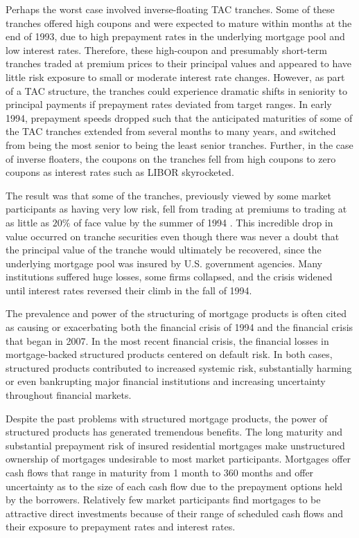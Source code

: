 \documentclass[11pt]{article}
\begin{document}
Perhaps the worst case involved inverse-floating TAC tranches. Some of these tranches offered high coupons and were expected to mature within months at the end of 1993, due to high prepayment rates in the underlying mortgage pool and low interest rates. Therefore, these high-coupon and presumably short-term tranches traded at premium prices to their principal values and appeared to have little risk exposure to small or moderate interest rate changes. However, as part of a TAC structure, the tranches could experience dramatic shifts in seniority to principal payments if prepayment rates deviated from target ranges. In early 1994, prepayment speeds dropped such that the anticipated maturities of some of the TAC tranches extended from several months to many years, and switched from being the most senior to being the least senior tranches. Further, in the case of inverse floaters, the coupons on the tranches fell from high coupons to zero coupons as interest rates such as LIBOR skyrocketed.

The result was that some of the tranches, previously viewed by some market participants as having very low risk, fell from trading at premiums to trading at as little as $20 \%$ of face value by the summer of 1994 . This incredible drop in value occurred on tranche securities even though there was never a doubt that the principal value of the tranche would ultimately be recovered, since the underlying mortgage pool was insured by U.S. government agencies. Many institutions suffered huge losses, some firms collapsed, and the crisis widened until interest rates reversed their climb in the fall of 1994.

The prevalence and power of the structuring of mortgage products is often cited as causing or exacerbating both the financial crisis of 1994 and the financial crisis that began in 2007. In the most recent financial crisis, the financial losses in mortgage-backed structured products centered on default risk. In both cases, structured products contributed to increased systemic risk, substantially harming or even bankrupting major financial institutions and increasing uncertainty throughout financial markets.

Despite the past problems with structured mortgage products, the power of structured products has generated tremendous benefits. The long maturity and substantial prepayment risk of insured residential mortgages make unstructured ownership of mortgages undesirable to most market participants. Mortgages offer cash flows that range in maturity from 1 month to 360 months and offer uncertainty as to the size of each cash flow due to the prepayment options held by the borrowers. Relatively few market participants find mortgages to be attractive direct investments because of their range of scheduled cash flows and their exposure to prepayment rates and interest rates.
\end{document}
